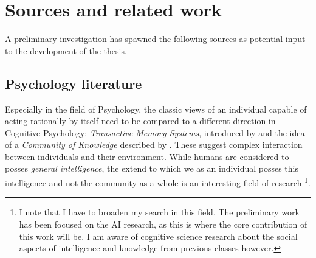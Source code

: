 \documentclass[12pt,a4paper]{article}
\begin{document}
\section{Sources and related work} A preliminary investigation has spawned the following sources as potential input to
the development of the thesis.

\subsection{Psychology literature} Especially in the field of Psychology, the classic views of an individual capable of
acting rationally by itself need to be compared to a different direction in Cognitive Psychology: \emph{Transactive
Memory Systems}, introduced by \citeauthor{wegner1995computer} and the idea of a \emph{Community of Knowledge} described
by \citeauthor{sloman2016cok}. These suggest complex interaction between individuals and their environment.
While humans are considered to posses \emph{general intelligence}, the extend to which we as an individual posses this
intelligence and not the community as a whole is an interesting field of research \footnote{I note that I have to
broaden my search in this field. The preliminary work has been focused on the AI research, as this is where the core
contribution of this work will be. I am aware of cognitive science research about the social aspects of intelligence and
knowledge from previous classes however.}.

\end{document}

